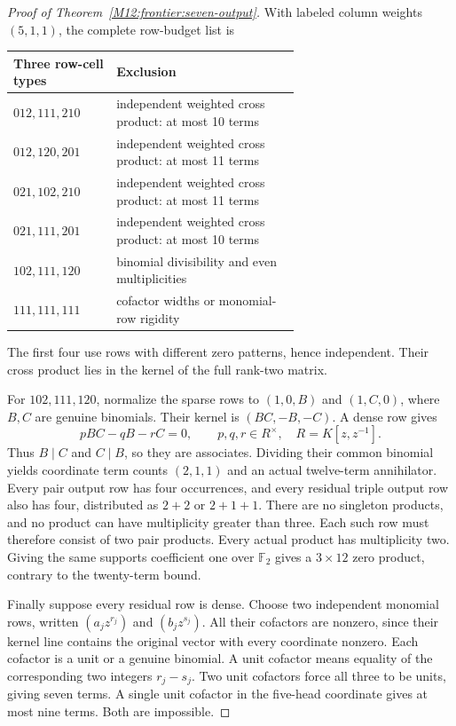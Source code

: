 \documentclass[11pt,a4paper,oneside]{report}
\theoremstyle{definition}
\theoremstyle{remark}
\begin{document}
\begin{proof}[Proof of Theorem~\ref{M12:frontier:seven-output}]
With labeled column weights $(5,1,1)$, the complete row-budget list is
\begin{center}
\begin{tabular}{@{}lp{0.64\linewidth}@{}}
\toprule
Three row-cell types & Exclusion\\
\midrule
$012,111,210$ & independent weighted cross product: at most 10 terms\\
$012,120,201$ & independent weighted cross product: at most 11 terms\\
$021,102,210$ & independent weighted cross product: at most 11 terms\\
$021,111,201$ & independent weighted cross product: at most 10 terms\\
$102,111,120$ & binomial divisibility and even multiplicities\\
$111,111,111$ & cofactor widths or monomial-row rigidity\\
\bottomrule
\end{tabular}
\end{center}
The first four use rows with different zero patterns, hence independent.
Their cross product lies in the kernel of the full rank-two matrix.

For $102,111,120$, normalize the sparse rows to $(1,0,B)$ and
$(1,C,0)$, where $B,C$ are genuine binomials. Their kernel is
$(BC,-B,-C)$. A dense row gives
\[
 pBC-qB-rC=0,\qquad p,q,r\in R^\times,
 \quad R=K[z,z^{-1}].
\]
Thus $B\mid C$ and $C\mid B$, so they are associates. Dividing their
common binomial yields coordinate term counts $(2,1,1)$ and an actual
twelve-term annihilator. Every pair output row has four occurrences,
and every residual triple output row also has four, distributed as
$2+2$ or $2+1+1$. There are no singleton products, and no product can
have multiplicity greater than three. Each such row must therefore
consist of two pair products. Every actual product has multiplicity
two. Giving the same supports coefficient one over $\mathbb F_2$
gives a $3\times12$ zero product, contrary to the twenty-term bound.

Finally suppose every residual row is dense. Choose two independent
monomial rows, written $(a_jz^{r_j})$ and $(b_jz^{s_j})$.
All their cofactors are nonzero, since their kernel line contains
the original vector with every coordinate nonzero. Each cofactor
is a unit or a genuine binomial. A unit cofactor means equality of
the corresponding two integers $r_j-s_j$. Two unit cofactors force
all three to be units, giving seven terms. A single unit cofactor
in the five-head coordinate gives at most nine terms. Both are
impossible.


\end{proof}
\end{document}
